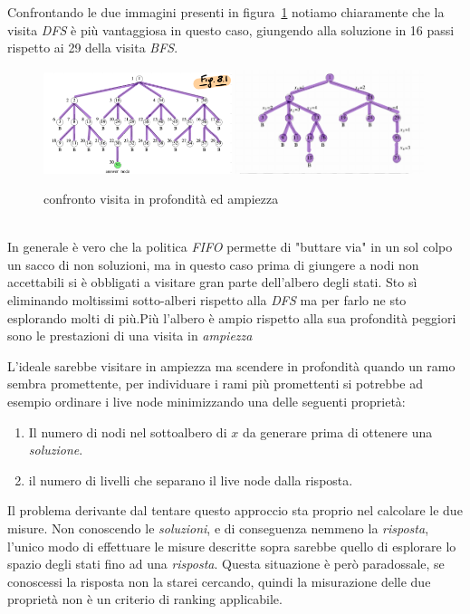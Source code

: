 \documentclass[a4paper]{article}
\begin{document}
\begin{adjustwidth}{.8cm}{0cm}
	Confrontando le due immagini presenti in figura~\ref{FIG:C_2_DFSvsBFS} notiamo chiaramente che la visita \textit{DFS} è più vantaggiosa in questo caso, giungendo alla soluzione in 16 passi rispetto ai 29 della visita \textit{BFS}.\\
\begin{figure}[!ht]
\centering
\includegraphics[width=0.49\textwidth]{./img/C_2_BFS.png}
\includegraphics[width=0.49\textwidth]{./img/C_2_DFS.png}
\caption{confronto visita in profondità ed ampiezza} \label{FIG:C_2_DFSvsBFS}
\end{figure}\\ 
In generale è vero che la politica \textit{FIFO} permette di "buttare via" in un sol colpo un sacco di non soluzioni, ma in questo caso prima di giungere a nodi non accettabili si è obbligati a visitare gran parte dell'albero degli stati.
Sto sì eliminando moltissimi sotto-alberi rispetto alla \textit{DFS} ma per farlo ne sto esplorando molti di più.Più l'albero è ampio rispetto alla sua profondità peggiori sono le prestazioni di una visita in \textit{ampiezza}


L'ideale sarebbe visitare in ampiezza ma scendere in profondità quando un ramo sembra promettente, per individuare i rami più promettenti si potrebbe ad esempio ordinare i live node minimizzando una delle seguenti proprietà:
\begin{enumerate}
	\item Il numero di nodi nel sottoalbero di $x$ da generare prima di ottenere una \emph{soluzione}.
	\item il numero di livelli che separano il live node dalla risposta.
\end{enumerate}
Il problema derivante dal tentare questo approccio sta proprio nel calcolare le due misure.
Non conoscendo le \textit{soluzioni}, e di conseguenza nemmeno la \textit{risposta}, l'unico modo di effettuare le misure descritte sopra sarebbe quello di esplorare lo spazio degli stati fino ad una \textit{risposta}.
Questa situazione è però paradossale, se conoscessi la risposta non la starei cercando, quindi la misurazione delle due proprietà non è un criterio di ranking applicabile.
\end{adjustwidth}
\end{document}
